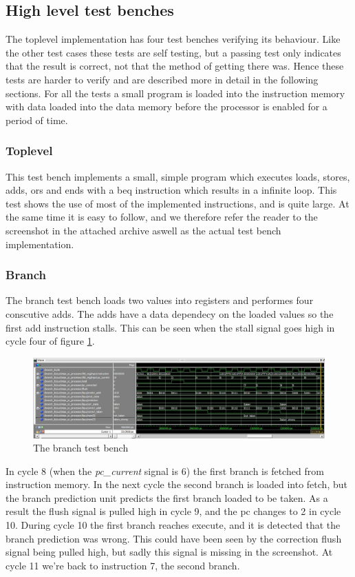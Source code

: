 \subsection{High level test benches}

The toplevel implementation has four test benches verifying its behaviour.
Like the other test cases these tests are self testing, but a passing test only 
indicates that the result is correct, not that the method of getting there was. 
Hence these tests are harder to verify and are described more in
detail in the following sections. For all the tests a small program is loaded 
into the instruction memory with data loaded into the data memory before the 
processor is enabled for a period of time. 

\subsubsection{Toplevel}
This test bench implements a small, simple program which executes loads, stores, 
adds, ors and ends with a beq instruction which results in a infinite loop.
This test shows the use of most of the implemented instructions, and is quite
large. At the same time it is easy to follow, and we therefore refer the reader
to the screenshot in the attached archive aswell as the actual test bench implementation.

\subsubsection{Branch} 
\label{section:branch-tb}
The branch test bench loads two values into registers and performes four 
conscutive adds. The adds have a data dependecy on the loaded values so the 
first add instruction stalls.
This can be seen when the stall signal goes high in cycle four of figure \ref{fig:branch_tb}.
\begin{figure}[h]
        \centerline{\includegraphics[width=600px]{figures/tb/branch}}
        \caption{The branch test bench}
        \label{fig:branch_tb}
\end{figure}
\FloatBarrier
In cycle 8 (when the \emph{pc\_current} signal is 6) the first branch is fetched from
instruction memory. In the next cycle the second branch is loaded into fetch,
but the branch prediction unit predicts the first branch loaded to be taken. 
As a result the flush signal is pulled high in cycle 9, and the pc changes to
2 in cycle 10.
During cycle 10 the first branch reaches execute, and it is detected that the
branch prediction was wrong. This could have been seen by the correction flush
signal being pulled high, but sadly this signal is missing in the screenshot.
At cycle 11 we're back to instruction 7, the second branch. 

